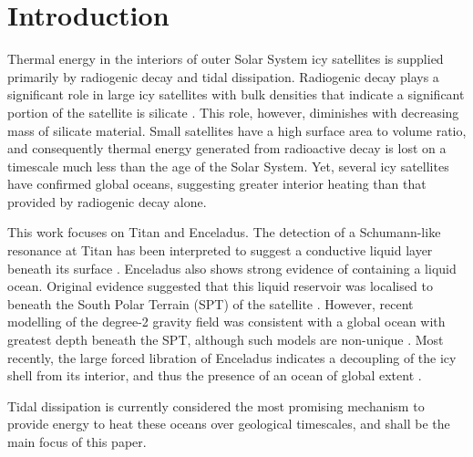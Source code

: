 \newpage
\section{Introduction}


Thermal energy in the interiors of outer Solar System icy satellites is supplied primarily by radiogenic decay and tidal dissipation. Radiogenic decay plays a significant role in large icy satellites with bulk densities that indicate a significant portion of the satellite is silicate \citep{hussmann2006subsurface}. This role, however, diminishes with decreasing mass of silicate material. Small satellites have a high surface area to volume ratio, and consequently thermal energy generated from radioactive decay is lost on a timescale much less than the age of the Solar System. Yet, several icy satellites have confirmed global oceans, suggesting greater interior heating than that provided by radiogenic decay alone.


This work focuses on Titan and Enceladus. The detection of a Schumann-like resonance at Titan has been interpreted to suggest a conductive liquid layer beneath its surface \citep{beghin2010titan}. Enceladus also shows strong evidence of containing a liquid ocean. Original evidence suggested that this liquid reservoir was localised to beneath the South Polar Terrain (SPT) of the satellite \citep[e.g.,][]{collins2007enceladus}. However, recent modelling of the degree-2 gravity field was consistent with a global ocean with greatest depth beneath the SPT, although such models are non-unique \citep{iess2014gravity,mckinnon2015effect}. Most recently, the large forced libration of Enceladus indicates a decoupling of the icy shell from its interior, and thus the presence of an ocean of global extent \citep{thomas2015enceladus}.  

Tidal dissipation is currently considered the most promising mechanism to provide energy to heat these oceans over geological timescales, and shall be the main focus of this paper.


